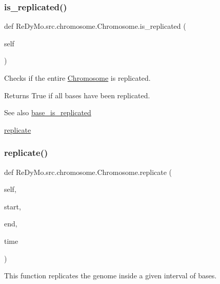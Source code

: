 \subsubsection{\texorpdfstring{is\+\_\+replicated()}{is\_replicated()}}
{\footnotesize\ttfamily def Re\+Dy\+Mo.\+src.\+chromosome.\+Chromosome.\+is\+\_\+replicated (\begin{DoxyParamCaption}\item[{}]{self }\end{DoxyParamCaption})}



Checks if the entire \mbox{\hyperlink{classReDyMo_1_1src_1_1chromosome_1_1Chromosome}{Chromosome}} is replicated. 

\begin{DoxyReturn}{Returns}
True if all bases have been replicated. 
\end{DoxyReturn}
\begin{DoxySeeAlso}{See also}
\mbox{\hyperlink{classReDyMo_1_1src_1_1chromosome_1_1Chromosome_a1dba7152914a8f8006a5ddfcaad82c31}{base\+\_\+is\+\_\+replicated}} 

\mbox{\hyperlink{classReDyMo_1_1src_1_1chromosome_1_1Chromosome_aac8462677b62589ca8f103c047c5c014}{replicate}} 
\end{DoxySeeAlso}
\mbox{\label{classReDyMo_1_1src_1_1chromosome_1_1Chromosome_aac8462677b62589ca8f103c047c5c014}} 
\subsubsection{\texorpdfstring{replicate()}{replicate()}}
{\footnotesize\ttfamily def Re\+Dy\+Mo.\+src.\+chromosome.\+Chromosome.\+replicate (\begin{DoxyParamCaption}\item[{}]{self,  }\item[{}]{start,  }\item[{}]{end,  }\item[{}]{time }\end{DoxyParamCaption})}



This function replicates the genome inside a given interval of bases. 

